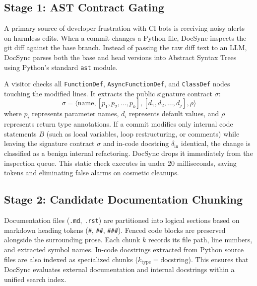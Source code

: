 \documentclass[12pt,onecolumn,draftclsnofoot]{IEEEtran}
\begin{document}
\subsection{Stage 1: AST Contract Gating}
A primary source of developer frustration with CI bots is receiving noisy alerts on harmless edits. When a commit changes a Python file, DocSync inspects the git diff against the base branch. Instead of passing the raw diff text to an LLM, DocSync parses both the base and head versions into Abstract Syntax Trees using Python's standard \texttt{ast} module.

A visitor checks all \texttt{FunctionDef}, \texttt{AsyncFunctionDef}, and \texttt{ClassDef} nodes touching the modified lines. It extracts the public signature contract $\sigma$:
\begin{equation}
\sigma = \langle \text{name}, [p_1, p_2, \dots, p_k], [d_1, d_2, \dots, d_j], \rho \rangle
\end{equation}
where $p_i$ represents parameter names, $d_i$ represents default values, and $\rho$ represents return type annotations.
If a commit modifies only internal code statements $B$ (such as local variables, loop restructuring, or comments) while leaving the signature contract $\sigma$ and in-code docstring $\delta_{\text{in}}$ identical, the change is classified as a benign internal refactoring. DocSync drops it immediately from the inspection queue. This static check executes in under 20 milliseconds, saving tokens and eliminating false alarms on cosmetic cleanups.

\subsection{Stage 2: Candidate Documentation Chunking}
Documentation files (\texttt{.md}, \texttt{.rst}) are partitioned into logical sections based on markdown heading tokens (\texttt{\#}, \texttt{\#\#}, \texttt{\#\#\#}). Fenced code blocks are preserved alongside the surrounding prose. Each chunk $k$ records its file path, line numbers, and extracted symbol names. In-code docstrings extracted from Python source files are also indexed as specialized chunks ($k_{\text{type}} = \text{docstring}$). This ensures that DocSync evaluates external documentation and internal docstrings within a unified search index.
\end{document}
